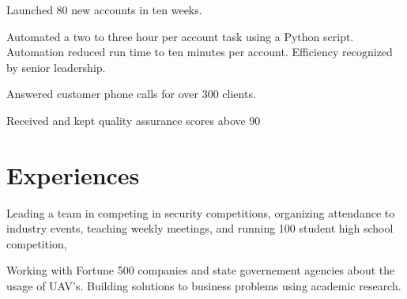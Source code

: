 \documentclass[letterpaper]{deedy-resume} %
\begin{document}
\begin{minipage}[t]{0.66\textwidth}
\sectionspace %



\begin{tightitemize}
\item Launched 80 new accounts in ten weeks.
\item Automated a two to three hour per account task using a Python script. Automation reduced run time to ten minutes per account. Efficiency recognized by senior leadership.
\end{tightitemize}

\sectionspace %



\begin{tightitemize}
\item Answered customer phone calls for over 300 clients.
\item Received and kept quality assurance scores above 90%
\end{tightitemize}

\sectionspace %


\section{Experiences}


Leading a team in competing in security competitions, organizing attendance to industry events, teaching weekly meetings, and running 100 student high school competition, 

\sectionspace %



Working with Fortune 500 companies and state governement agencies about the usage of UAV's. Building solutions to business problems using academic research. 


\end{minipage}
\end{document}
